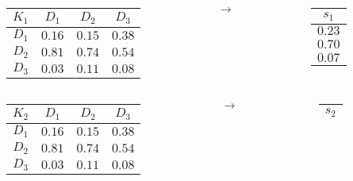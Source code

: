 \documentclass{beamer}
\begin{document}
\begin{frame}
	\begin{columns}
		\begin{column}{0.4\textwidth}
			\begin{table}
				\begin{tabular}{c|c|c|c}
				$K_1$	&	$D_1$	&	$D_2$	&	$D_3$\\ \hline
				$D_1$	&	$0.16$	&	$0.15$	&	$0.38$\\ \hline
				$D_2$	&	$0.81$	&	$0.74$	&	$0.54$\\ \hline
				$D_3$	&	$0.03$	&	$0.11$	&	$0.08$
				\end{tabular}
			\end{table}
		\end{column}
		\begin{column}{0.1\textwidth}
			$\rightarrow$
		\end{column}
		\begin{column}{0.1\textwidth}
			\begin{table}
				\begin{tabular}{c}
				$s_1$\\ \hline
				$0.23$\\
				$0.70$\\
				$0.07$
				\end{tabular}
			\end{table}
		\end{column}
	\end{columns}
	\begin{columns}
		\begin{column}{0.4\textwidth}
			\begin{table}
				\begin{tabular}{c|c|c|c}
				$K_2$	&	$D_1$	&	$D_2$	&	$D_3$\\ \hline
				$D_1$	&	$0.16$	&	$0.15$	&	$0.38$\\ \hline
				$D_2$	&	$0.81$	&	$0.74$	&	$0.54$\\ \hline
				$D_3$	&	$0.03$	&	$0.11$	&	$0.08$
				\end{tabular}
			\end{table}
		\end{column}
		\begin{column}{0.1\textwidth}
			$\rightarrow$
		\end{column}
		\begin{column}{0.1\textwidth}
			\begin{table}
				\begin{tabular}{c}
				$s_2$\\ \hline

\end{tabular}
\end{table}
\end{column}
\end{columns}
\end{frame}
\end{document}
